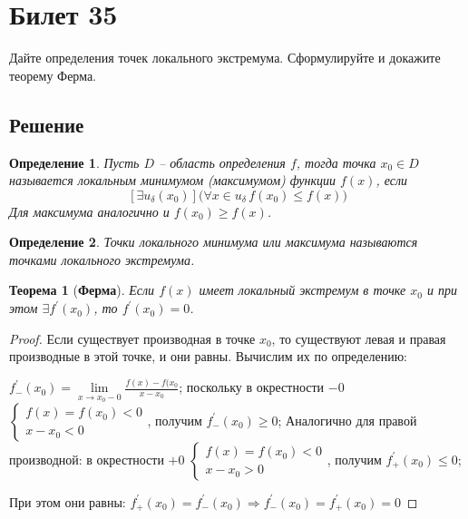\documentclass[a4paper,12pt]{article}
\newtheorem*{ther}{Теорема}
\newtheorem*{defi}{Определение}
\newcommand{\drv}{^{\prime}}
\begin{document}
    \section*{Билет 35}

    Дайте определения точек локального экстремума. Сформулируйте и докажите
    теорему Ферма.

    \subsection*{Решение}
    \begin{defi}
        Пусть $D$ -- область определения $f$, тогда точка $x_0 \in D$
        называется локальным минимумом (максимумом) функции $f(x)$, если
        $$
            [\exists u_{\delta}(x_0)]\big(\forall x \in u_{\delta} \, f(x_0)
            \leq f(x) \big)
        $$
        Для максимума аналогично и $f(x_0) \geq f(x)$.
    \end{defi}

    \begin{defi}
        Точки локального минимума или максимума называются точками локального
        экстремума.
    \end{defi}

    \begin{ther}[\textbf{Ферма}]
        Если $f(x)$ имеет локальный экстремум в точке $x_0$ и при этом $\exists
        f\drv(x_0)$, то $f\drv(x_0) = 0$.
    \end{ther}

    \begin{proof}
        Если существует производная в точке $x_0$, то существуют левая и правая
        производные в этой точке, и они равны. Вычислим их по определению:\par
        $f_{-}\drv(x_0) = \lim\limits_{x \to x_0 - 0}\frac{f(x)-f(x_0}{x-x_0}$;
        поскольку в окрестности $-0$
        $
        \begin{cases}
            f(x) = f(x_0) < 0 \\
            x - x_0 < 0
        \end{cases}
        $, получим $f_{-}\drv(x_0) \geq 0$;
        Аналогично для правой производной: в окрестности $+0$
        $
        \begin{cases}
            f(x) = f(x_0) < 0 \\
            x - x_0 > 0
        \end{cases}
        $, получим $f_{+}\drv(x_0) \leq 0$;\par
        При этом они равны: $f_{+}\drv(x_0) = f_{-}\drv(x_0) \Rightarrow f_{-}\drv(x_0) =
        f_{+}\drv(x_0) = 0$
    \end{proof}
\end{document}
